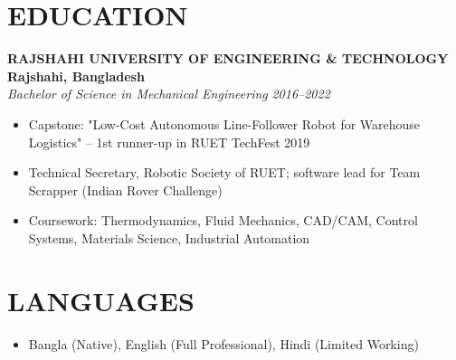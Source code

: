 \documentclass[11pt,letterpaper]{article}
\newcommand{\role}[4]{
  \begin{center}
  \textbf{#1} \hfill \textbf{#2} \\
  \textit{#3} \hfill \textit{#4}
  \end{center}
}
\begin{document}
\vspace{1em}
\section{EDUCATION}

\vspace{0.5em}
\role{RAJSHAHI UNIVERSITY OF ENGINEERING \& TECHNOLOGY}{Rajshahi, Bangladesh}{Bachelor of Science in Mechanical Engineering}{2016--2022}
\begin{itemize}[leftmargin=*,nosep,topsep=0pt]
  \item Capstone: "Low-Cost Autonomous Line-Follower Robot for Warehouse Logistics" -- 1st runner-up in RUET TechFest 2019
  \item Technical Secretary, Robotic Society of RUET; software lead for Team Scrapper (Indian Rover Challenge)
  \item Coursework: Thermodynamics, Fluid Mechanics, CAD/CAM, Control Systems, Materials Science, Industrial Automation
\end{itemize}

\vspace{1em}
\section{LANGUAGES}

\vspace{0.5em}
\begin{itemize}[leftmargin=*,nosep]
  \item Bangla (Native), English (Full Professional), Hindi (Limited Working)
\end{itemize}
\end{document}
